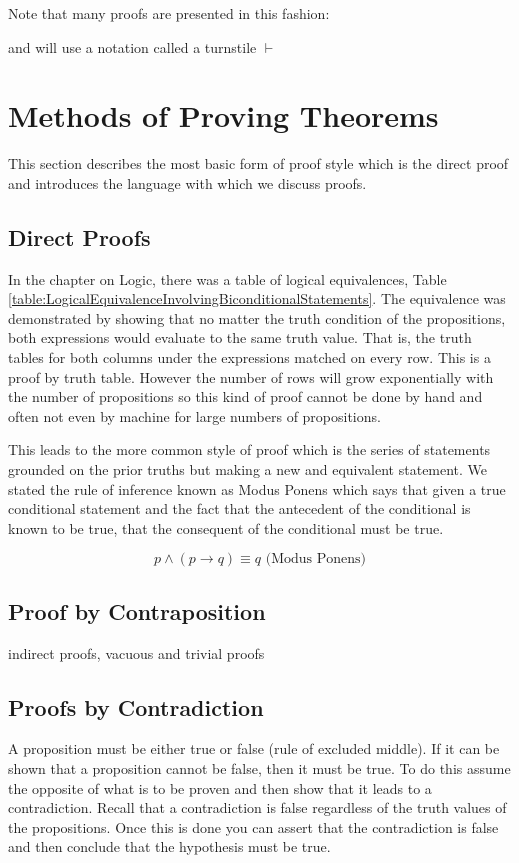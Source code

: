 \documentclass[11pt]{book} %
\theoremstyle {definition}
\theoremstyle {remark}
\begin{document}
Note that many proofs are presented in this fashion:

and will use a notation called a turnstile $\vdash$
    
\section {Methods of Proving Theorems}
This section describes the most basic form of proof style which is the direct proof and introduces the language with which we discuss proofs.
    \subsection {Direct Proofs}
In the chapter on Logic, there was a table of logical equivalences, Table \ref{table:LogicalEquivalenceInvolvingBiconditionalStatements}. The equivalence was demonstrated by showing that no matter the truth condition of the propositions, both expressions would evaluate to the same truth value. That is, the truth tables for both columns under the expressions matched on every row. This is a proof by truth table. However the number of rows will grow exponentially with the number of propositions so this kind of proof cannot be done by hand and often not even by machine for large numbers of propositions. 

This leads to the more common style of proof which is the series of statements grounded on the prior truths but making a new and equivalent statement. We stated the rule of inference known as Modus Ponens which says that given a true conditional statement and the fact that the antecedent of the conditional is known to be true, that the consequent of the conditional must be true. 

$$p \land (p \rightarrow q) \equiv q  \text{    (Modus Ponens)}$$
    
    \subsection {Proof by Contraposition}
    indirect proofs, vacuous and trivial proofs
    \subsection {Proofs by Contradiction}
    A proposition must be either true or false (rule of excluded middle). If it can be shown that a proposition cannot be false, then it must be true. To do this assume the opposite of what is to be proven and then show that it leads to a contradiction. Recall that a contradiction is false regardless of the truth values of the propositions. Once this is done you can assert that the contradiction is false and then conclude that the hypothesis must be true.
\end{document}
